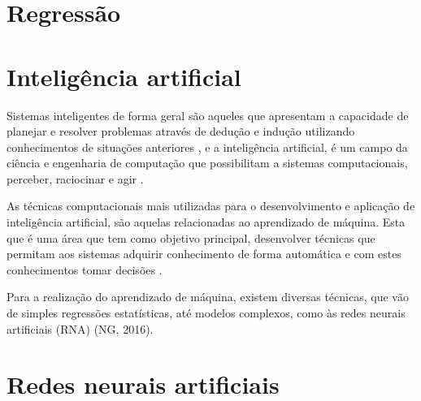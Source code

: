 \section{Regressão}


\section{Inteligência artificial}



\par Sistemas inteligentes de forma geral são aqueles que apresentam a capacidade de planejar e resolver problemas através de dedução e indução utilizando conhecimentos de situações anteriores \cite{VonZuben2013}, e a inteligência artificial, é um campo da ciência e engenharia de computação \cite{VonZuben2013} que possibilitam a sistemas computacionais, perceber, raciocinar e agir \cite{Winston1992}.

\par As técnicas computacionais mais utilizadas para o desenvolvimento e aplicação de inteligência artificial, são aquelas relacionadas ao aprendizado de máquina. Esta que é uma área que tem como objetivo principal, desenvolver técnicas que permitam aos sistemas adquirir conhecimento de forma automática e com estes conhecimentos tomar decisões \cite{Augusto2007}.

\par Para a realização do aprendizado de máquina, existem diversas técnicas, que vão de simples regressões estatísticas, até modelos complexos, como às redes neurais artificiais (RNA) (NG, 2016).

\section{Redes neurais artificiais}

